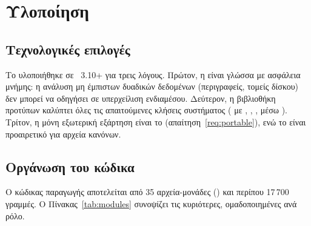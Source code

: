 \chapter{Υλοποίηση}
\label{ch:implementation}

\section{Τεχνολογικές επιλογές}
\label{sec:impl-tech}

Το \Probolos{} υλοποιήθηκε σε ~3.10+ για τρεις λόγους. Πρώτον, η
 είναι γλώσσα με ασφάλεια μνήμης: η ανάλυση μη έμπιστων δυαδικών
δεδομένων (περιγραφείς, τομείς δίσκου) δεν μπορεί να οδηγήσει σε υπερχείλιση
ενδιαμέσου. Δεύτερον, η βιβλιοθήκη προτύπων καλύπτει όλες τις απαιτούμενες
κλήσεις συστήματος ( με ,
, ,  μέσω ).
Τρίτον, η μόνη εξωτερική εξάρτηση είναι το  (απαίτηση~\ref{req:portable}),
ενώ το  είναι προαιρετικό για αρχεία κανόνων.

\section{Οργάνωση του κώδικα}
\label{sec:impl-modules}

Ο κώδικας παραγωγής αποτελείται από 35 αρχεία-μονάδες () και περίπου 17\,700
γραμμές. Ο Πίνακας~\ref{tab:modules} συνοψίζει τις κυριότερες, ομαδοποιημένες
ανά ρόλο.

